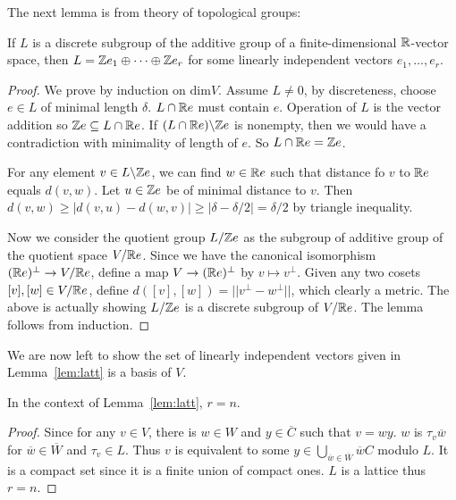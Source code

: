 \documentclass[../main.tex]{subfiles}
\begin{document}
The next lemma is from theory of topological groups:

\begin{lemma}\label{lem:latt}
    If $L$ is a discrete subgroup of the additive group of a finite-dimensional $\mathbb{R}$-vector space, then $L=\mathbb{Z} e_1\oplus\dots\oplus \mathbb{Z} e_r$ for some linearly independent vectors $e_1,\dots,e_r$. 
\end{lemma}

\begin{proof}
    We prove by induction on $\text{dim}V$. Assume $L \neq 0$, by discreteness, choose $e\in L$ of minimal length $\delta$. $L\cap \mathbb{R} e$ must contain $e$. Operation of $L$ is the vector addition so $\mathbb{Z} e \subseteq L\cap \mathbb{R} e$. If $(L\cap \mathbb{R} e) \backslash \mathbb{Z} e$ is nonempty, then we would have a contradiction with minimality of length of $e$. So $L\cap \mathbb{R} e = \mathbb{Z} e$. 

    For any element $v\in L \backslash \mathbb{Z} e$, we can find $w\in \mathbb{R} e$ such that distance fo $v$ to $\mathbb{R} e$ equals $d(v,w)$. Let $u\in\mathbb{Z} e$ be of minimal distance to $v$. Then $d(v,w)\geq |d(v,u)-d(w,v)| \geq |\delta-\delta/2|=\delta/2$ by triangle inequality.

    Now we consider the quotient group $L/\mathbb{Z} e$ as the subgroup of additive group of the quotient space $V/ \mathbb{R} e$. Since we have the canonical isomorphism $(\mathbb{R} e)^{\perp} \rightarrow V/\mathbb{R} e$, define a map $V\rightarrow (\mathbb{R} e)^{\perp}$ by $v \mapsto v^{\perp}$. Given any two cosets $[v],[w]\in V/\mathbb{R} e$, define $d([v],[w])=||v^{\perp}-w^{\perp}||$, which clearly a metric. The above is actually showing $L/\mathbb{Z} e$ is a discrete subgroup of $V/\mathbb{R} e$. The lemma follows from induction.
\end{proof}

We are now left to show the set of linearly independent vectors given in Lemma~\ref{lem:latt} is a basis of $V$.

\begin{lemma}
    In the context of Lemma~\ref{lem:latt}, $r=n$.
\end{lemma}

\begin{proof}
    Since for any $v\in V$, there is $w\in W$ and $y\in \overline C$ such that $v=wy$. $w$ is $\tau_v\overline w$ for $\overline w\in \overline W$ and $\tau_v\in L$. Thus $v$ is equivalent to some $y\in \bigcup_{\overline w\in\overline W}\overline wC$ modulo $L$. It is a compact set since it is a finite union of compact ones. $L$ is a lattice thus $r=n$.
\end{proof}
\end{document}
